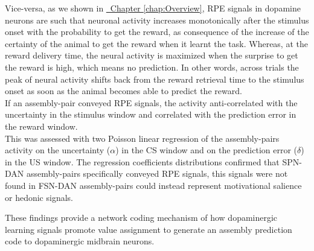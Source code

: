 \begin{itemize}
    Vice-versa, as we shown in \hyperref[chap:Overview]{~Chapter \ref*{chap:Overview}}, RPE signals in dopamine neurons are such that neuronal activity increases monotonically after the stimulus onset with the probability to get the reward, as consequence of the increase of the certainty of the animal to get the reward when it learnt the task. Whereas, at the reward delivery time, the neural activity is maximized when the surprise to get the reward is high, which means no prediction. In other words, across trials the peak of neural activity shifts back from the reward retrieval time to the stimulus onset as soon as the animal becomes able to predict the reward.\\If an assembly-pair conveyed RPE signals, the activity anti-correlated with the uncertainty in the stimulus window and correlated with the prediction error in the reward window.\\This was assessed with two Poisson linear regression of the assembly-pairs activity on the uncertainty ($\alpha$) in the CS window and on the prediction error ($\delta$) in the US window. The regression coefficients distributions confirmed that SPN-DAN assembly-pairs specifically conveyed RPE signals, this signals were not found in FSN-DAN assembly-pairs could instead represent motivational salience or hedonic signals.
\end{itemize}
  These findings provide a network coding mechanism of how dopaminergic learning signals promote value assignment to generate an assembly prediction code to dopaminergic midbrain neurons. 